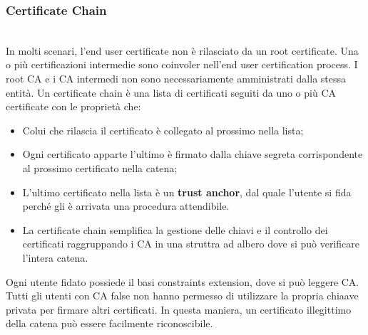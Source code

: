 \documentclass{book}
\theoremstyle{remark}
\begin{document}
\subsubsection{Certificate Chain}\mbox{}\\
In molti scenari, l'end user certificate non è rilasciato da un root certificate\@. Una o più certificazioni intermedie sono coinvoler nell'end user certification process\@. I root CA e i CA intermedi non sono necessariamente amministrati dalla stessa entità\@. Un certificate chain è una lista di certificati seguiti da uno o più CA certificate con le proprietà che:\begin{itemize}
	\item Colui che rilascia il certificato è collegato al prossimo nella lista;\@
	\item Ogni certificato apparte l'ultimo è firmato dalla chiave segreta corrispondente al prossimo certificato nella catena;\@
	\item L'ultimo certificato nella lista è un \textbf{trust anchor}, dal quale l'utente si fida perché gli è arrivata una procedura attendibile\@.
	\item La certificate chain semplifica la gestione delle chiavi e il controllo dei certificati raggruppando i CA in una struttra ad albero dove si può verificare l'intera catena\@.
\end{itemize}
Ogni utente fidato possiede il basi constraints extension, dove si può leggere CA\@. Tutti gli utenti con CA false non hanno permesso di utilizzare la propria chiaave privata per firmare altri certificati\@. In questa maniera, un certificato illegittimo della catena può essere facilmente riconoscibile\@.
\end{document}
